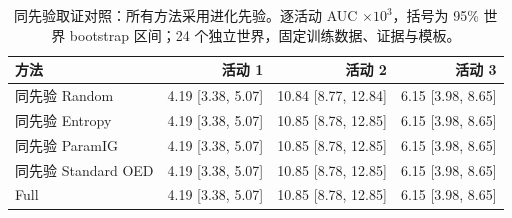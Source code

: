 \begin{table}[tbp]
\centering
\caption{同先验取证对照：所有方法采用进化先验。逐活动 AUC $\times10^3$，括号为 95\% 世界 bootstrap 区间；24 个独立世界，固定训练数据、证据与模板。}
\label{tab:acquisition_matched}
\scriptsize
\setlength{\tabcolsep}{3pt}
\begin{tabular}{lrrr}
\toprule
方法 & 活动 1 & 活动 2 & 活动 3 \\
\midrule
同先验 Random & 4.19 [3.38, 5.07] & 10.84 [8.77, 12.84] & 6.15 [3.98, 8.65] \\
同先验 Entropy & 4.19 [3.38, 5.07] & 10.85 [8.78, 12.85] & 6.15 [3.98, 8.65] \\
同先验 ParamIG & 4.19 [3.38, 5.07] & 10.85 [8.78, 12.85] & 6.15 [3.98, 8.65] \\
同先验 Standard OED & 4.19 [3.38, 5.07] & 10.85 [8.78, 12.85] & 6.15 [3.98, 8.65] \\
Full & 4.19 [3.38, 5.07] & 10.85 [8.78, 12.85] & 6.15 [3.98, 8.65] \\
\bottomrule
\end{tabular}
\end{table}
